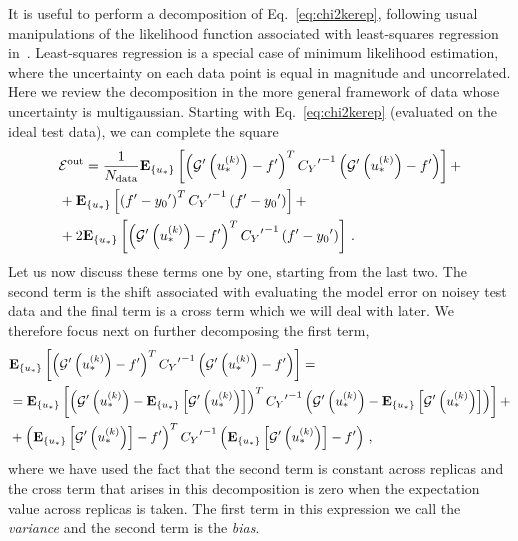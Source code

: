 It is useful to perform a decomposition of Eq.~\ref{eq:chi2kerep}, following
usual manipulations of the likelihood function associated with least-squares
regression in~\cite{mlforphysics}. Least-squares regression is a special case of
minimum likelihood estimation, where the uncertainty on each data point is equal
in magnitude and uncorrelated. Here we review the decomposition in the more
general framework of data whose uncertainty is multigaussian. Starting with
Eq.~\ref{eq:chi2kerep} (evaluated on the ideal test data), we can complete the
square
\begin{equation}
    \begin{split}
    \label{eq:EoutDecomposition}
        &\mathcal{E}^{\rm out} = \frac{1}{N_{\rm data}} \mathbf{E}_{\{ u_* \}} \left[ 
            \left( {{\mathcal{G}}^{\prime}}\left(u_*^{(k)}\right) - {{f}^{\prime}} \right)^T
            {{C_{Y}}^{\prime}}^{-1}
            \left( {{\mathcal{G}}^{\prime}}\left(u_*^{(k)}\right) - {{f}^{\prime}} \right)
         \right] + \\
        &+ \mathbf{E}_{\{ u_* \}} \left[ 
            \left( {{f}^{\prime}} - {{y_0}^{\prime}} \right)^T
            {{C_{Y}}^{\prime}}^{-1}
            \left( {{f}^{\prime}} - {{y_0}^{\prime}} \right)
         \right]+ \\
        &+ 2 \mathbf{E}_{\{ u_* \}} \left[ 
            \left( {{\mathcal{G}}^{\prime}}\left(u_*^{(k)}\right) - {{f}^{\prime}} \right)^T
            {{C_{Y}}^{\prime}}^{-1}
            \left({{f}^{\prime}} - {{y_0}^{\prime}} \right)
         \right]\, .
    \end{split}
\end{equation}
Let us now discuss these terms one by one, starting from the last two. The
second term is the shift associated with evaluating the model error on noisey
test data and the final term is a cross term which we will deal with later. We
therefore focus next on further decomposing the first term,
\begin{equation}
    \begin{split}
        &\mathbf{E}_{\{ u_* \}} \left[ 
            \left( {{\mathcal{G}}^{\prime}}\left(u_*^{(k)}\right) - {{f}^{\prime}} \right)^T
            {{C_{Y}}^{\prime}}^{-1}
            \left( {{\mathcal{G}}^{\prime}}\left(u_*^{(k)}\right) - {{f}^{\prime}} \right)
         \right] = \\
        &= \mathbf{E}_{\{ u_* \}} \left[ 
            \left( {{\mathcal{G}}^{\prime}}\left(u_*^{(k)}\right) - 
            \mathbf{E}_{\{ u_* \}} \left[ {{\mathcal{G}}^{\prime}}\left(u_*^{(k)}\right) \right] \right)^T
            {{C_{Y}}^{\prime}}^{-1}
            \left( {{\mathcal{G}}^{\prime}}\left(u_*^{(k)}\right) - 
            \mathbf{E}_{\{ u_* \}} \left[ {{\mathcal{G}}^{\prime}}\left(u_*^{(k)}\right) \right] \right)
         \right] + \\
        &+ \left( \mathbf{E}_{\{ u_* \}} \left[ {{\mathcal{G}}^{\prime}}\left(u_*^{(k)}\right) \right] - {{f}^{\prime}} \right)^T
        {{C_{Y}}^{\prime}}^{-1}
        \left( \mathbf{E}_{\{ u_* \}} \left[ {{\mathcal{G}}^{\prime}}\left(u_*^{(k)}\right) \right] - {{f}^{\prime}} \right)\, ,
    \end{split}
\end{equation}
where we have used the fact that the second term is constant across replicas and
the cross term that arises in this decomposition is zero when the expectation
value across replicas is taken. The first term in this expression we call the
{\em variance} and the second term is the {\em bias}.

